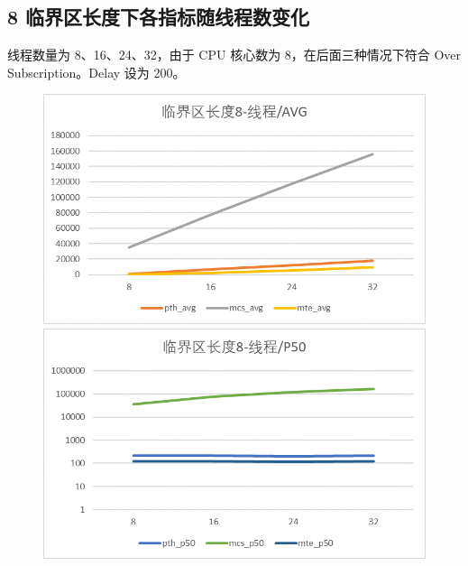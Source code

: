 \documentclass[UTF8]{ctexart}
\begin{document}
\subsection{8 临界区长度下各指标随线程数变化}

线程数量为 8、16、24、32，由于 CPU 核心数为 8，在后面三种情况下符合 Over Subscription。Delay 设为 200。

\begin{figure}[!h]
    \centering
    \begin{minipage}{0.49\linewidth}
        \centering
        \includegraphics[scale=0.64]{../images/9.png}
    \end{minipage}
    \begin{minipage}{0.49\linewidth}
        \centering
        \includegraphics[scale=0.64]{../images/10.png}
    \end{minipage}
\end{figure}
\end{document}
